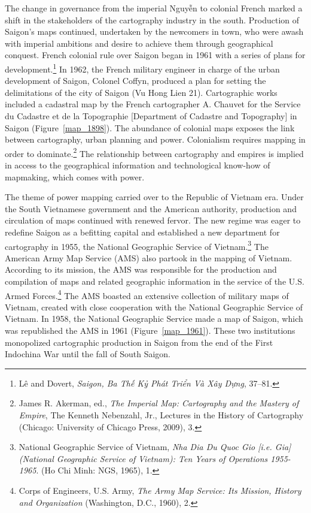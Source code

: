 \vi
The change in governance from the imperial Nguyễn to colonial French marked a shift in the stakeholders of the cartography industry in the south. Production of Saigon’s maps continued, undertaken by the newcomers in town, who were awash with imperial ambitions and desire to achieve them through geographical conquest. French colonial rule over Saigon began in 1961 with a series of plans for development.\footnote{Lê and Dovert, \textit{Saigon, Ba Thế Kỷ Phát Triển Và Xây Dựng}, 37–81.} In 1962, the French military engineer in charge of the urban development of Saigon, Colonel Coffyn, produced a plan for setting the delimitations of the city of Saigon (Vu Hong Lien 21). Cartographic works included a cadastral map by the French cartographer A. Chauvet for the Service du Cadastre et de la Topographie [Department of Cadastre and Topography] in Saigon (Figure~\ref{map_1898}). The abundance of colonial maps exposes the link between cartography, urban planning and power. Colonialism requires mapping in order to dominate.\footnote{James R. Akerman, ed., \textit{The Imperial Map: Cartography and the Mastery of Empire}, The Kenneth Nebenzahl, Jr., Lectures in the History of Cartography (Chicago: University of Chicago Press, 2009), 3.} The relationship between cartography and empires is implied in access to the geographical information and technological know-how of mapmaking, which comes with power.

The theme of power mapping carried over to the Republic of Vietnam era. Under the South Vietnamese government and the American authority, production and circulation of maps continued with renewed fervor. The new regime was eager to redefine Saigon as a befitting capital and established a new department for cartography in 1955, the National Geographic Service of Vietnam.\footnote{National Geographic Service of Vietnam, \textit {Nha Dia Du Quoc Gio [i.e. Gia] (National Geographic Service of Vietnam): Ten Years of Operations 1955-1965}. (Ho Chi Minh: NGS, 1965), 1.} The American Army Map Service (AMS) also partook in the mapping of Vietnam. According to its mission, the AMS was responsible for the production and compilation of maps and related geographic information in the service of the U.S. Armed Forces.\footnote{Corps of Engineers, U.S. Army, \textit{The Army Map Service: Its Mission, History and Organization} (Washington, D.C., 1960), 2.} The AMS boasted an extensive collection of military maps of Vietnam, created with close cooperation with the National Geographic Service of Vietnam. In 1958, the National Geographic Service made a map of Saigon, which was republished the AMS in 1961 (Figure~\ref{map_1961}). These two institutions monopolized cartographic production in Saigon from the end of the First Indochina War until the fall of South Saigon.
\en

